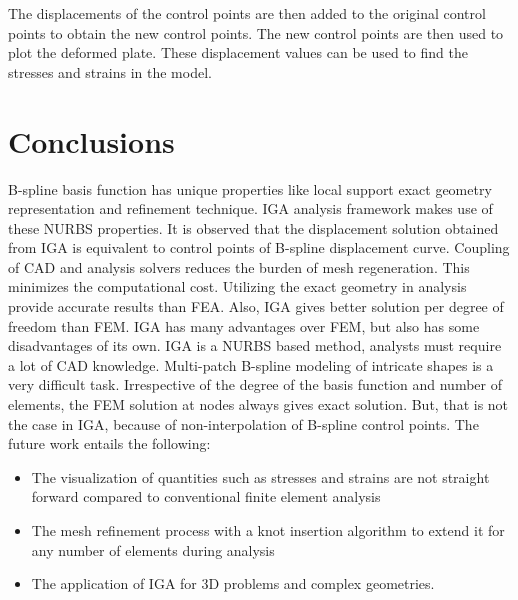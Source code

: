 \documentclass[submit,12pt]{aiaa-pretty} %
\begin{document}
The displacements of the control points are then added to the original control points to obtain the new control points. The new control points are then used to plot the deformed plate. These displacement values can be used to find the stresses and strains in the model.

\section{Conclusions}
B-spline basis function has unique properties like local support exact
geometry representation and refinement technique. IGA analysis
framework makes use of these NURBS properties. It is observed that the
displacement solution obtained from IGA is equivalent to control
points of B-spline displacement curve. Coupling of CAD and analysis
solvers reduces the burden of mesh regeneration. This minimizes the
computational cost. Utilizing the exact geometry in analysis provide
accurate results than FEA. Also, IGA gives better solution per degree
of freedom than FEM.  IGA has many advantages over FEM, but also has
some disadvantages of its own. IGA is a NURBS based method, analysts
must require a lot of CAD knowledge. Multi-patch B-spline modeling of
intricate shapes is a very difficult task. Irrespective of the degree
of the basis function and number of elements, the FEM solution at
nodes always gives exact solution. But, that is not the case in IGA,
because of non-interpolation of B-spline control points.
The future work entails the following:
\begin{itemize}
    \item The visualization of quantities such as stresses and strains
      are not straight forward compared to conventional finite element
      analysis
    \item The mesh refinement process with a knot insertion algorithm
      to extend it for any number of elements during analysis
    \item The application of IGA for 3D problems and complex geometries.
\end{itemize}



\end{document}
